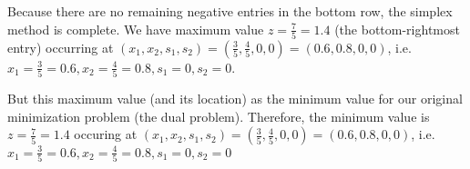 \documentclass[11pt,letterpaper]{article}
\begin{document}
Because there are no remaining negative entries in the bottom row, the simplex method is complete. We have maximum value $z= \frac{7}{5}= 1.4$ (the bottom-rightmost entry) occurring at $(x_1, x_2, s_1, s_2)= (\frac{3}{5}, \frac{4}{5}, 0, 0)= (0.6, 0.8, 0, 0)$, i.e. $x_1= \frac{3}{5}= 0.6, x_2= \frac{4}{5}= 0.8, s_1= 0, s_2= 0$. \pspace

But this maximum value (and its location) as the minimum value for our original minimization problem (the dual problem). Therefore, the minimum value is $z= \frac{7}{5}= 1.4$ occuring at $(x_1, x_2, s_1, s_2)= (\frac{3}{5}, \frac{4}{5}, 0, 0)= (0.6, 0.8, 0, 0)$, i.e. $x_1= \frac{3}{5}= 0.6, x_2= \frac{4}{5}= 0.8, s_1= 0, s_2= 0$
\end{document}
